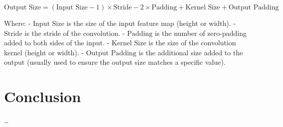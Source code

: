 \documentclass[12pt]{article}
\begin{document}
\[ \text{Output Size} = (\text{Input Size} - 1) \times \text{Stride} - 2 \times \text{Padding} + \text{Kernel Size} + \text{Output Padding} \]

Where:
- \(\text{Input Size}\) is the size of the input feature map (height or width).
- \(\text{Stride}\) is the stride of the convolution.
- \(\text{Padding}\) is the number of zero-padding added to both sides of the input.
- \(\text{Kernel Size}\) is the size of the convolution kernel (height or width).
- \(\text{Output Padding}\) is the additional size added to the output (usually used to ensure the output size matches a specific value).

\section{Conclusion}
\ldots

\newpage
\begin{footnotesize} %
\singlespacing %
\setlength{\bibsep}{5pt} %
\thispagestyle{empty} %
\end{footnotesize} %
\end{document}
